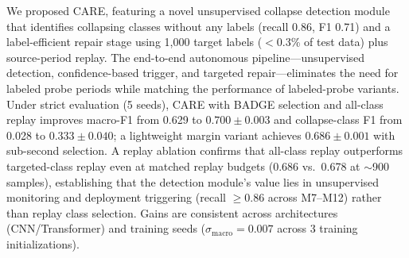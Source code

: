 \documentclass[journal]{IEEEtran}
\newcommand{\ours}{CARE}  %
\begin{document}
We proposed \ours{}, featuring a novel unsupervised collapse detection module that identifies collapsing classes without any labels (recall 0.86, F1 0.71) and a label-efficient repair stage using 1{,}000 target labels ($<$0.3\% of test data) plus source-period replay.
The end-to-end autonomous pipeline---unsupervised detection, confidence-based trigger, and targeted repair---eliminates the need for labeled probe periods while matching the performance of labeled-probe variants.
Under strict evaluation (5 seeds), \ours{} with BADGE selection and all-class replay improves macro-F1 from 0.629 to $0.700{\pm}0.003$ and collapse-class F1 from 0.028 to $0.333{\pm}0.040$; a lightweight margin variant achieves $0.686{\pm}0.001$ with sub-second selection.
A replay ablation confirms that all-class replay outperforms targeted-class replay even at matched replay budgets (0.686 vs.\ 0.678 at ${\sim}$900 samples), establishing that the detection module's value lies in unsupervised monitoring and deployment triggering (recall $\geq$0.86 across M7--M12) rather than replay class selection.
Gains are consistent across architectures (CNN/Transformer) and training seeds ($\sigma_{\text{macro}}{=}0.007$ across 3 training initializations).



\end{document}

